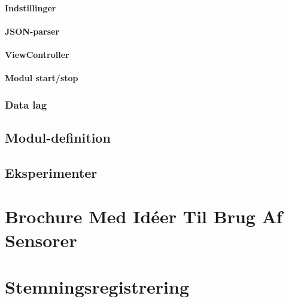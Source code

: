 \subsubsection{Indstillinger}

\subsubsection{JSON-parser}
\subsubsection{ViewController} %
\subsubsection{Modul start/stop} %

\subsection{Data lag}


\section{Modul-definition}


\section{Eksperimenter}




\label{bib:mybiblio}

\appendix


\chapter{Brochure Med Idéer Til Brug Af Sensorer}\label{app:brochure}
 

\chapter{Stemningsregistrering}


